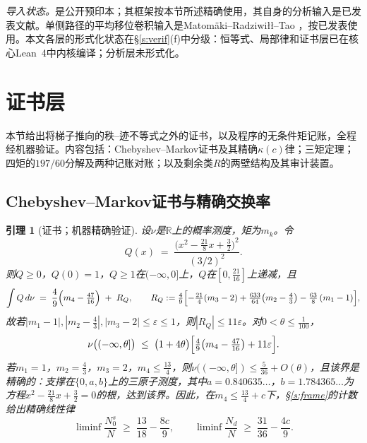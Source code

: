 \documentclass[11pt]{article}
\numberwithin{equation}{section}
\newtheorem{lemma}[theorem]{引理}
\theoremstyle{definition}
\theoremstyle{remark}
\begin{document}
\emph{导入状态。}\cite{C26}是公开预印本；其框架按本节所述精确使用，其自身的分析输入是已发表文献\cite{Wei52,IK,Tit86,Mon73,BGST}。单侧路径的平均移位卷积输入是Matom\"aki--Radziwi\l{}\l--Tao \cite{MRT}，按已发表使用。本文各层的形式化状态在\S\ref{s:verif}(f)中分级：恒等式、局部律和证书层已在核心Lean~4中内核编译；分析层未形式化。

\section{证书层}\label{s:cert}

本节给出将梯子推向\cite[引理3.2]{C26}的秩--迹不等式之外的证书，以及程序的无条件矩记账，全程经机器验证。内容包括：Chebyshev--Markov证书及其精确$\kappa(c)$律；三矩定理；四矩的$197/60$分解及两种记账对账；以及剩余类$R$的两壁结构及其审计装置。

\subsection{Chebyshev--Markov证书与精确交换率}

\begin{lemma}[证书；机器精确验证]\label{l:cert}
设$\nu$是$\mathbb R$上的概率测度，矩为$m_k$。令
\[
Q(x)\;=\;\frac{\bigl(x^2-\tfrac{21}{8}x+\tfrac32\bigr)^2}{(3/2)^2}.
\]
则$Q\ge0$，$Q(0)=1$，$Q\ge1$在$(-\infty,0]$上，$Q$在$[0,\tfrac{21}{16}]$上递减，且
\begin{equation}\label{e:EQ}
\int Q\,d\nu \;=\; \frac{4}{9}\Bigl(m_4-\tfrac{47}{16}\Bigr)
\;+\;R_Q,\qquad
R_Q:=\tfrac{4}{9}\Bigl[-\tfrac{21}{4}(m_3-2)
+\tfrac{633}{64}\bigl(m_2-\tfrac43\bigr)
-\tfrac{63}{8}\,(m_1-1)\Bigr],
\end{equation}
故若$|m_1-1|,|m_2-\tfrac43|,|m_3-2|\le\varepsilon\le1$，则$|R_Q|\le11\varepsilon$。对$0<\theta\le\tfrac1{100}$，
\[
\nu\bigl((-\infty,\theta]\bigr)
\;\le\;\bigl(1+4\theta\bigr)
\Bigl[\tfrac{4}{9}\bigl(m_4-\tfrac{47}{16}\bigr)
+11\varepsilon\Bigr].
\]
若$m_1=1$，$m_2=\tfrac43$，$m_3=2$，$m_4\le\tfrac{13}4$，则$\nu((-\infty,\theta])\le\tfrac5{36}+O(\theta)$，且该界是精确的：支撑在$\{0,a,b\}$上的三原子测度，其中$a=0.840635\ldots$，$b=1.784365\ldots$为方程$x^2-\tfrac{21}8x+\tfrac32=0$的根，达到该界。因此，在$m_4\le\tfrac{13}4+c$下，\S\ref{s:frame}的计数给出精确线性律
\[
\liminf\frac{N_0^{s}}{N}\;\ge\;\frac{13}{18}-\frac{8c}{9},
\qquad
\liminf\frac{N_d}{N}\;\ge\;\frac{31}{36}-\frac{4c}{9}.
\]
\end{lemma}
\end{document}
